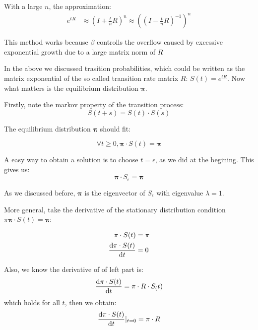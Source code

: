 \documentclass[12pt]{book}
\begin{document}
            With a large $n$, the approximation:
            \begin{align*}
                e ^{tR} &\approx \left(I+\frac{t}{n}R\right)^n \approx \left( \left(I - \frac{t}{n}R \right)^{-1} \right)^n 
            \end{align*} 

        This method works because $\beta$ controlls the overflow caused by excessive exponential growth due to a large matrix norm of $R$

        In the above we discussed trasition probabilities, which could be written as the matrix exponential of the so called transition rate matrix $R$: $S(t) = e ^{tR}$. Now what matters is the equilibrium distribution $\mathbf{\pi}$.

        Firstly, note the markov property of the transition process:
        \begin{equation*}
            S(t+s) = S(t)\cdot S(s)
        \end{equation*}

        The equilibrium distribution $\mathbf{\pi}$ should fit:

        \begin{equation}\label{eq:\thesection:equilibrium_distribution}
            \forall t \geq 0, \mathbf{\pi} \cdot S(t) = \mathbf{\pi}
        \end{equation}

        A easy way to obtain a solution is to choose $t = \epsilon$, as we did at the begining. This gives us:
        \begin{equation*}
            \mathbf{\pi} \cdot S_{\epsilon} = \mathbf{\pi}
        \end{equation*}

        As we discussed before, $\mathbf{\pi}$ is the eigenvector of $S_{\epsilon}$ with eigenvalue $\lambda = 1$.

        More general, take the derivative of the stationary distribution condition $\pi \mathbf{\pi} \cdot S(t) = \mathbf{\pi}$:

        \begin{align*}
            \mathbf{\pi} \cdot S(t) &= \mathbf{\pi}\\
            \frac{\textup{d} \mathbf{\pi} \cdot S(t)}{\textup{d} t} &= 0\\
        \end{align*}

        Also, we know the derivative of of left part is:
        \begin{equation*}
            \frac{\textup{d} \mathbf{\pi} \cdot S(t)}{\textup{d} t} = \mathbf{\pi} \cdot R \cdot S_(t)
        \end{equation*}
        which holds for all $t$, then we obtain:
        \begin{equation*}
            \frac{\textup{d} \mathbf{\pi} \cdot S(t)}{\textup{d} t} |_{t=0} = \mathbf{\pi} \cdot R
        \end{equation*}
\end{document}
